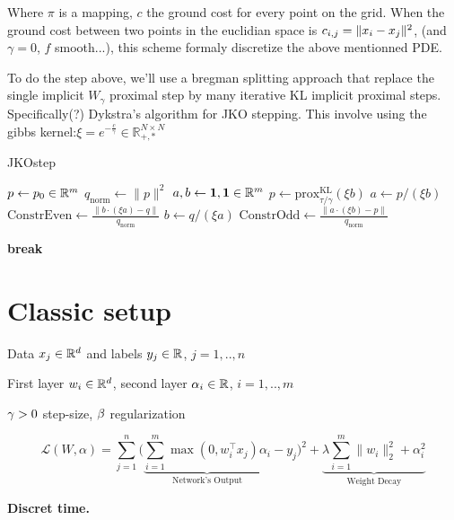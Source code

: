 Where $\pi$ is a mapping, $c$ the ground cost for every point on the grid. When the ground cost between two points in the euclidian space is $c_{i,j} = \lVert x_i- x_j\rVert^2$, (and $\gamma=0$, $f$ smooth...), this scheme formaly discretize the above mentionned PDE.

To do the step above, we'll use a bregman splitting approach that replace the single implicit $W_\gamma$ proximal step by many iterative KL implicit proximal steps. Specifically(?) Dykstra's algorithm for JKO stepping. This involve using the gibbs kernel:$\xi = e^{-\frac{c}{\gamma}} \in \mathbb{R}^{N \times N}_{+, \ast}$


\begin{algorithm}
\caption{JKOstep}
\begin{algorithmic}[1]
\State $p \gets p_0 \in \mathbb{R}^m$
\State $q_{\text{norm}} \gets \lVert p \rVert^2$
\State $a, b \gets \mathbf{1}, \mathbf{1} \in \mathbb{R}^m$ 
\State $p \gets \text{prox}^{\text{KL}}_{\tau/\gamma}(\xi b)$
    \State $a \gets p / (\xi b)$
    \State $\text{ConstrEven} \gets \frac{\lVert b \cdot (\xi a) - q \rVert}{q_{\text{norm}}}$
    \State $b \gets q / (\xi a)$
    \State $\text{ConstrOdd} \gets \frac{\lVert a \cdot (\xi b) - p \rVert}{q_{\text{norm}}}$
    
        \State \textbf{break}
    \EndIf
\EndFor
\end{algorithmic}
\end{algorithm}

\section{Classic setup}

Data $x_j \in \mathbb{R}^d$ and labels $y_j \in \mathbb{R}$, $j=1,..,n$

First layer $w_i \in \mathbb{R}^d$, second layer $\alpha_i \in \mathbb{R}$, $i=1,..,m$

$\gamma>0$ step-size, $\beta$ regularization

\begin{equation}
	 \mathcal{L}(W, \alpha) = \sum_{j=1}^n \bigg( \underbrace{\sum_{i=1}^m \max(0, w_i^\top x_j) \alpha_i}_{\text{Network's Output}} - y_j \bigg)^2 + \underbrace{\lambda \sum_{i=1}^m \| w_i \|^2_2 + \alpha_i^2}_{\text{Weight Decay}}
\end{equation}


\textbf{Discret time.}

